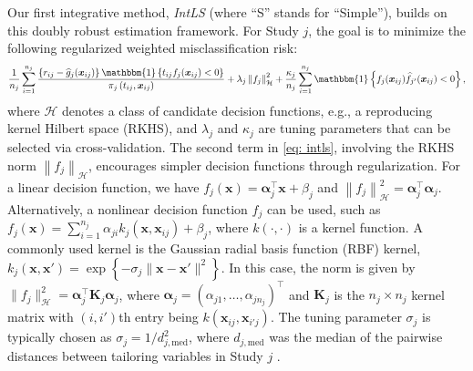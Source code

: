 \documentclass[12pt]{article}
\begin{document}
Our first integrative method, {\it IntLS} (where ``S'' stands for ``Simple''), builds on this doubly robust estimation framework. For Study $j$, the goal is to minimize the following regularized weighted misclassification risk:
\begin{equation}
    \frac{1}{n_j}\sum^{n_j}_{i=1}\frac{\left\{r_{ij}-\widehat{g}_j(\boldsymbol x_{ij})\right\}\mathbbm{1}\left\{t_{ij}f_j(\boldsymbol x_{ij})<0\right\}}{\pi_j\left(t_{ij},\boldsymbol x_{ij}\right)}+\lambda_j\left\|f_j\right\|^2_\mathcal{H}+\frac{\kappa_j}{n_j}\sum^{n_j}_{i=1}\mathbbm{1}\left\{f_j(\boldsymbol x_{ij})\widehat{f}_{j'}(\boldsymbol x_{ij})<0\right\}, \label{eq: intls}
\end{equation}
where $\mathcal{H}$ denotes a class of candidate decision functions, e.g., a reproducing kernel Hilbert space (RKHS), and $\lambda_j$ and $\kappa_j$ are tuning parameters that can be selected via cross-validation. The second term in \eqref{eq: intls}, involving the RKHS norm $\left\|f_j\right\|_\mathcal{H}$, encourages simpler decision functions through regularization.  For a linear decision function, we have $f_j(\boldsymbol x)=\boldsymbol\alpha_j^\top \boldsymbol x + \beta_j$ and $\left\|f_j\right\|^2_\mathcal{H}=\boldsymbol\alpha_j^\top\boldsymbol\alpha_j$. Alternatively, a nonlinear decision function $f_j$ can be used, such as $f_j(\boldsymbol x)=\sum^{n_j}_{i=1}\alpha_{ji} k_j(\boldsymbol x, \boldsymbol x_{ij}) + \beta_j$, where $k(\cdot,\cdot)$ is a kernel function. A commonly used kernel is the Gaussian radial basis function (RBF) kernel, $k_j(\boldsymbol x, \boldsymbol x')=\exp\left\{-\sigma_j\|\boldsymbol x-\boldsymbol x'\|^2\right\}$. In this case, the norm is given by $\|f_j\|^2_\mathcal{H}=\boldsymbol \alpha_j^\top\boldsymbol K_j \boldsymbol\alpha_j$, where $\boldsymbol\alpha_j=(\alpha_{j1},\ldots,\alpha_{jn_j})^\top$ and $\boldsymbol K_j$ is the $n_j\times n_j$ kernel matrix with $(i, i')$th entry being $k(\boldsymbol x_{ij}, \boldsymbol x_{i'j})$. The tuning parameter $\sigma_j$ is typically chosen as $\sigma_j=1/d_{j,\text{med}}^2$, where $d_{j,\text{med}}$ was the median of the pairwise distances between tailoring variables in Study $j$ \citep[e.g.,][]{wang2018learning}. 
\end{document}
